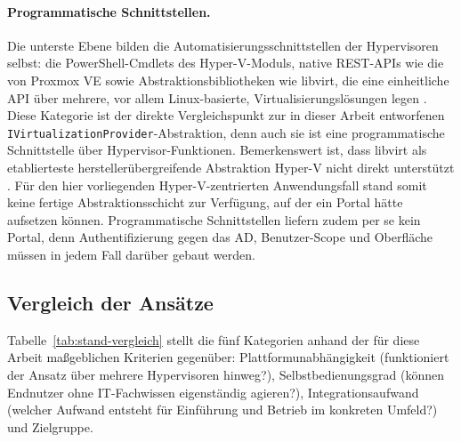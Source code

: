 \documentclass[12pt,a4paper]{article}
\begin{document}
\paragraph{Programmatische Schnittstellen.} Die unterste Ebene bilden die Automatisierungsschnittstellen der Hypervisoren selbst: die PowerShell-Cmdlets des Hyper-V-Moduls, native REST-APIs wie die von Proxmox VE sowie Abstraktionsbibliotheken wie libvirt, die eine einheitliche API über mehrere, vor allem Linux-basierte, Virtualisierungslösungen legen \parencite{libvirt-drivers}. Diese Kategorie ist der direkte Vergleichspunkt zur in dieser Arbeit entworfenen \texttt{IVirtualizationProvider}-Abstraktion, denn auch sie ist eine programmatische Schnittstelle über Hypervisor-Funktionen. Bemerkenswert ist, dass libvirt als etablierteste herstellerübergreifende Abstraktion Hyper-V nicht direkt unterstützt \parencite{libvirt-drivers}. Für den hier vorliegenden Hyper-V-zentrierten Anwendungsfall stand somit keine fertige Abstraktionsschicht zur Verfügung, auf der ein Portal hätte aufsetzen können. Programmatische Schnittstellen liefern zudem per se kein Portal, denn Authentifizierung gegen das AD, Benutzer-Scope und Oberfläche müssen in jedem Fall darüber gebaut werden.

\subsection{Vergleich der Ansätze}
\label{sec:stand-vergleich}

Tabelle~\ref{tab:stand-vergleich} stellt die fünf Kategorien anhand der für diese Arbeit maßgeblichen Kriterien gegenüber: Plattformunabhängigkeit (funktioniert der Ansatz über mehrere Hypervisoren hinweg?), Selbstbedienungsgrad (können Endnutzer ohne IT-Fachwissen eigenständig agieren?), Integrationsaufwand (welcher Aufwand entsteht für Einführung und Betrieb im konkreten Umfeld?) und Zielgruppe.
\end{document}
